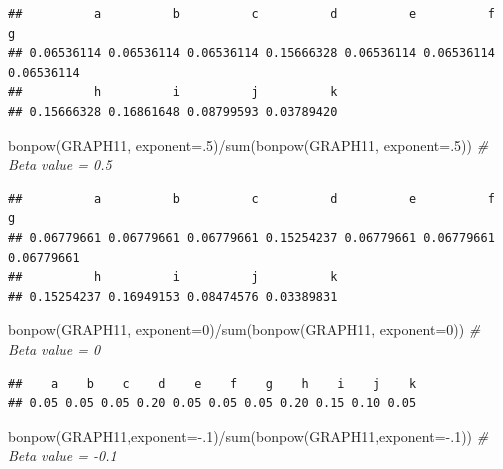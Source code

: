 \documentclass[
  notitlepage,
  onecolumn,
  openany]{book}
\newenvironment{Shaded}{\begin{snugshade}}{\end{snugshade}}
\newcommand{\AttributeTok}[1]{\textcolor[rgb]{0.77,0.63,0.00}{#1}}
\newcommand{\CommentTok}[1]{\textcolor[rgb]{0.56,0.35,0.01}{\textit{#1}}}
\newcommand{\DecValTok}[1]{\textcolor[rgb]{0.00,0.00,0.81}{#1}}
\newcommand{\FunctionTok}[1]{\textcolor[rgb]{0.00,0.00,0.00}{#1}}
\newcommand{\NormalTok}[1]{#1}
\newcommand{\SpecialCharTok}[1]{\textcolor[rgb]{0.00,0.00,0.00}{#1}}
\begin{document}
\begin{verbatim}
##          a          b          c          d          e          f          g 
## 0.06536114 0.06536114 0.06536114 0.15666328 0.06536114 0.06536114 0.06536114 
##          h          i          j          k 
## 0.15666328 0.16861648 0.08799593 0.03789420
\end{verbatim}

\begin{Shaded}
\begin{Highlighting}[]
\FunctionTok{bonpow}\NormalTok{(GRAPH11, }\AttributeTok{exponent=}\NormalTok{.}\DecValTok{5}\NormalTok{)}\SpecialCharTok{/}\FunctionTok{sum}\NormalTok{(}\FunctionTok{bonpow}\NormalTok{(GRAPH11, }\AttributeTok{exponent=}\NormalTok{.}\DecValTok{5}\NormalTok{)) }\CommentTok{\# Beta value = 0.5}
\end{Highlighting}
\end{Shaded}

\begin{verbatim}
##          a          b          c          d          e          f          g 
## 0.06779661 0.06779661 0.06779661 0.15254237 0.06779661 0.06779661 0.06779661 
##          h          i          j          k 
## 0.15254237 0.16949153 0.08474576 0.03389831
\end{verbatim}

\begin{Shaded}
\begin{Highlighting}[]
\FunctionTok{bonpow}\NormalTok{(GRAPH11, }\AttributeTok{exponent=}\DecValTok{0}\NormalTok{)}\SpecialCharTok{/}\FunctionTok{sum}\NormalTok{(}\FunctionTok{bonpow}\NormalTok{(GRAPH11, }\AttributeTok{exponent=}\DecValTok{0}\NormalTok{)) }\CommentTok{\# Beta value = 0}
\end{Highlighting}
\end{Shaded}

\begin{verbatim}
##    a    b    c    d    e    f    g    h    i    j    k 
## 0.05 0.05 0.05 0.20 0.05 0.05 0.05 0.20 0.15 0.10 0.05
\end{verbatim}

\begin{Shaded}
\begin{Highlighting}[]
\FunctionTok{bonpow}\NormalTok{(GRAPH11,}\AttributeTok{exponent=}\SpecialCharTok{{-}}\NormalTok{.}\DecValTok{1}\NormalTok{)}\SpecialCharTok{/}\FunctionTok{sum}\NormalTok{(}\FunctionTok{bonpow}\NormalTok{(GRAPH11,}\AttributeTok{exponent=}\SpecialCharTok{{-}}\NormalTok{.}\DecValTok{1}\NormalTok{)) }\CommentTok{\# Beta value = {-}0.1}
\end{Highlighting}
\end{Shaded}
\end{document}
